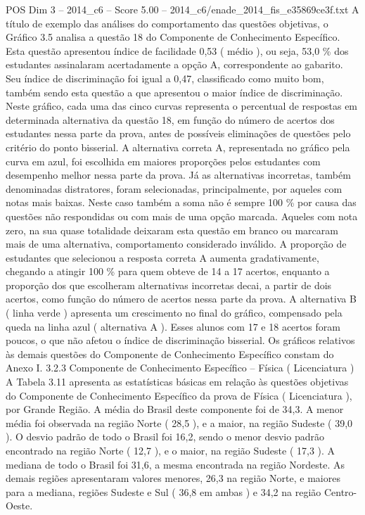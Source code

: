 \begin{textsample}{POS Dim 3 – 2014\_c6 – Score 5.00 – 2014\_c6/enade\_2014\_fis\_e35869ce3f.txt}
A título de exemplo das análises do comportamento das questões objetivas, o Gráfico 3.5 analisa a questão 18 do Componente de Conhecimento Específico.
Esta questão apresentou índice de facilidade 0,53 ( médio ), ou seja, 53,0 \% dos estudantes assinalaram acertadamente a opção A, correspondente ao gabarito.
Seu índice de discriminação foi igual a 0,47, classificado como muito bom, também sendo esta questão a que apresentou o maior índice de discriminação.
Neste gráfico, cada uma das cinco curvas representa o percentual de respostas em determinada alternativa da questão 18, em função do número de acertos dos estudantes nessa parte da prova, antes de possíveis eliminações de questões pelo critério do ponto bisserial.
A alternativa correta A, representada no gráfico pela curva em azul, foi escolhida em maiores proporções pelos estudantes com desempenho melhor nessa parte da prova.
Já as alternativas incorretas, também denominadas distratores, foram selecionadas, principalmente, por aqueles com notas mais baixas.
Neste caso também a soma não é sempre 100 \% por causa das questões não respondidas ou com mais de uma opção marcada.
Aqueles com nota zero, na sua quase totalidade deixaram esta questão em branco ou marcaram mais de uma alternativa, comportamento considerado inválido.
A proporção de estudantes que selecionou a resposta correta A aumenta gradativamente, chegando a atingir 100 \% para quem obteve de 14 a 17 acertos, enquanto a proporção dos que escolheram alternativas incorretas decai, a partir de dois acertos, como função do número de acertos nessa parte da prova.
A alternativa B ( linha verde ) apresenta um crescimento no final do gráfico, compensado pela queda na linha azul ( alternativa A ).
Esses alunos com 17 e 18 acertos foram poucos, o que não afetou o índice de discriminação bisserial.
Os gráficos relativos às demais questões do Componente de Conhecimento Específico constam do Anexo I. 3.2.3 Componente de Conhecimento Específico – Física ( Licenciatura ) A Tabela 3.11 apresenta as estatísticas básicas em relação às questões objetivas do Componente de Conhecimento Específico da prova de Física ( Licenciatura ), por Grande Região.
A média do Brasil deste componente foi de 34,3.
A menor média foi observada na região Norte ( 28,5 ), e a maior, na região Sudeste ( 39,0 ).
O desvio padrão de todo o Brasil foi 16,2, sendo o menor desvio padrão encontrado na região Norte ( 12,7 ), e o maior, na região Sudeste ( 17,3 ).
A mediana de todo o Brasil foi 31,6, a mesma encontrada na região Nordeste.
As demais regiões apresentaram valores menores, 26,3 na região Norte, e maiores para a mediana, regiões Sudeste e Sul ( 36,8 em ambas ) e 34,2 na região Centro-Oeste.

\end{textsample}
